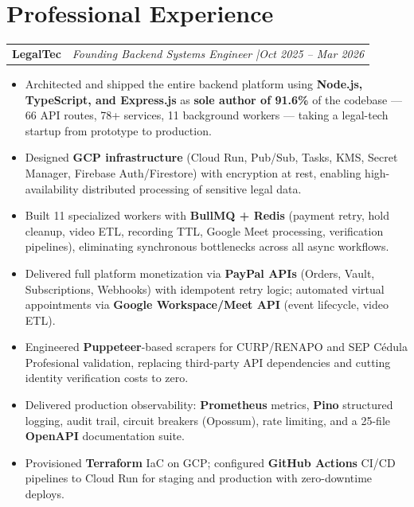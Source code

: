 \documentclass[10pt, letterpaper]{article}
\makeatletter
\newcommand{\entry}[2]{%
  \noindent\begin{tabular*}{\textwidth}{@{}l@{\extracolsep{\fill}}r@{}}
    #1 & #2
  \end{tabular*}}
\newenvironment{cvlist}{%
  \begin{itemize}[leftmargin=1.2em,itemsep=0.5pt,topsep=2pt,parsep=0pt]
}{\end{itemize}}
\makeatother
\begin{document}
\section{Professional Experience}

\entry{\textbf{LegalTec}}{%
  \textit{Founding Backend Systems Engineer \enspace|\enspace Oct 2025 -- Mar 2026}}

\begin{cvlist}
  \item Architected and shipped the entire backend platform using \textbf{Node.js,
        TypeScript, and Express.js} as \textbf{sole author of 91.6\%} of the codebase
        --- 66 API routes, 78+ services, 11 background workers --- taking a legal-tech
        startup from prototype to production.
  \item Designed \textbf{GCP infrastructure} (Cloud Run, Pub/Sub, Tasks, KMS, Secret
        Manager, Firebase Auth/Firestore) with encryption at rest, enabling
        high-availability distributed processing of sensitive legal data.
  \item Built 11 specialized workers with \textbf{BullMQ + Redis} (payment retry, hold
        cleanup, video ETL, recording TTL, Google Meet processing, verification
        pipelines), eliminating synchronous bottlenecks across all async workflows.
  \item Delivered full platform monetization via \textbf{PayPal APIs} (Orders, Vault,
        Subscriptions, Webhooks) with idempotent retry logic; automated virtual
        appointments via \textbf{Google Workspace/Meet API} (event lifecycle, video ETL).
  \item Engineered \textbf{Puppeteer}-based scrapers for CURP/RENAPO and SEP C\'{e}dula
        Profesional validation, replacing third-party API dependencies and cutting
        identity verification costs to zero.
  \item Delivered production observability: \textbf{Prometheus} metrics, \textbf{Pino}
        structured logging, audit trail, circuit breakers (Opossum), rate limiting,
        and a 25-file \textbf{OpenAPI} documentation suite.
  \item Provisioned \textbf{Terraform} IaC on GCP; configured \textbf{GitHub Actions}
        CI/CD pipelines to Cloud Run for staging and production with zero-downtime deploys.
\end{cvlist}

\medskip
\end{document}
